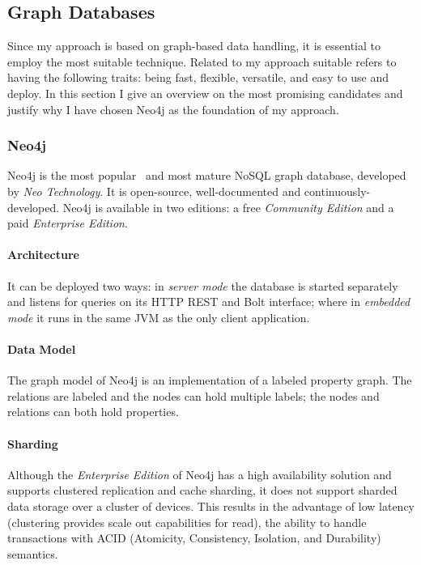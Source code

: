 
\subsection{Graph Databases}
\label{sect:graph-databases}
Since my approach is based on graph-based data handling, it is essential to employ the most suitable technique. Related to my approach suitable refers to having the following traits: being fast, flexible, versatile, and easy to use and deploy. In this section I give an overview on the most promising candidates and justify why I have chosen Neo4j as the foundation of my approach.

\subsubsection{Neo4j}
\label{sect:neo4j}
Neo4j is the most popular~\cite{db-engines-ranking} and most mature NoSQL graph database, developed by \emph{Neo Technology}. It is open-source, well-documented and continuously-developed. Neo4j is available in two editions: a free \emph{Community Edition} and a paid \emph{Enterprise Edition}.~\cite{neo4j}

\paragraph{Architecture}
It can be deployed two ways: in \emph{server mode} the database is started separately and listens for queries on its HTTP REST and Bolt interface; where in \emph{embedded mode} it runs in the same JVM as the only client application.

\paragraph{Data Model}
The graph model of Neo4j is an implementation of a labeled property graph. The relations are labeled and the nodes can hold multiple labels; the nodes and relations can both hold properties.

\paragraph{Sharding}
Although the \emph{Enterprise Edition} of Neo4j has a high availability solution and supports clustered replication and cache sharding, it does not support sharded data storage over a cluster of devices. This results in the advantage of low latency (clustering provides scale out capabilities for read), the ability to handle transactions with ACID (Atomicity, Consistency, Isolation, and Durability) semantics.~\cite{neo4j-product}

